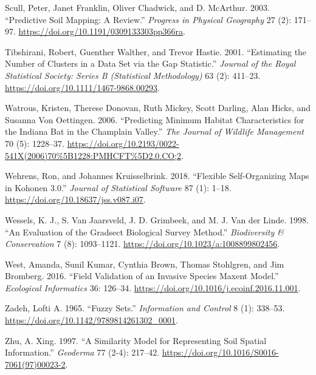 \begin{CSLReferences}{1}{0}
\leavevmode{}%
Scull, Peter, Janet Franklin, Oliver Chadwick, and D. McArthur. 2003. {``Predictive Soil Mapping: A Review.''} \emph{Progress in Physical Geography} 27 (2): 171--97. \url{https://doi.org/10.1191/0309133303pp366ra}.

\leavevmode{}%
Tibshirani, Robert, Guenther Walther, and Trevor Hastie. 2001. {``Estimating the Number of Clusters in a Data Set via the Gap Statistic.''} \emph{Journal of the Royal Statistical Society: Series B (Statistical Methodology)} 63 (2): 411--23. \url{https://doi.org/10.1111/1467-9868.00293}.

\leavevmode{}%
Watrous, Kristen, Therese Donovan, Ruth Mickey, Scott Darling, Alan Hicks, and Susanna Von Oettingen. 2006. {``Predicting Minimum Habitat Characteristics for the {I}ndiana Bat in the {C}hamplain {V}alley.''} \emph{The Journal of Wildlife Management} 70 (5): 1228--37. \url{https://doi.org/10.2193/0022-541X(2006)70\%5B1228:PMHCFT\%5D2.0.CO;2}.

\leavevmode{}%
Wehrens, Ron, and Johannes Kruisselbrink. 2018. {``Flexible Self-Organizing Maps in Kohonen 3.0.''} \emph{Journal of Statistical Software} 87 (1): 1--18. \url{https://doi.org/10.18637/jss.v087.i07}.

\leavevmode{}%
Wessels, K. J., S. Van Jaarsveld, J. D. Grimbeek, and M. J. Van der Linde. 1998. {``An Evaluation of the Gradsect Biological Survey Method.''} \emph{Biodiversity \& Conservation} 7 (8): 1093--1121. \url{https://doi.org/10.1023/a:1008899802456}.

\leavevmode{}%
West, Amanda, Sunil Kumar, Cynthia Brown, Thomas Stohlgren, and Jim Bromberg. 2016. {``Field Validation of an Invasive Species Maxent Model.''} \emph{Ecological Informatics} 36: 126--34. \url{https://doi.org/10.1016/j.ecoinf.2016.11.001}.

\leavevmode{}%
Zadeh, Lofti A. 1965. {``Fuzzy Sets.''} \emph{Information and Control} 8 (1): 338--53. \url{https://doi.org/10.1142/9789814261302_0001}.

\leavevmode{}%
Zhu, A. Xing. 1997. {``A Similarity Model for Representing Soil Spatial Information.''} \emph{Geoderma} 77 (2-4): 217--42. \url{https://doi.org/10.1016/S0016-7061(97)00023-2}.


\end{CSLReferences}

